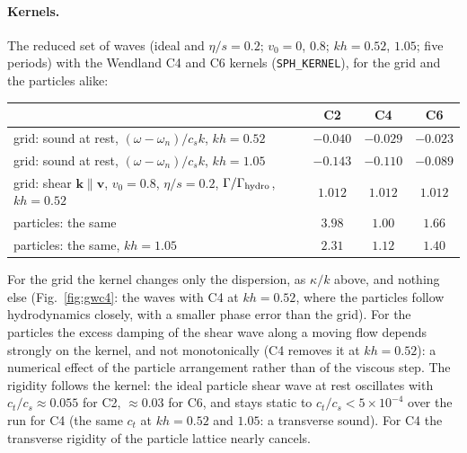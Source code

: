 \documentclass[11pt,aps,preprint,nofootinbib,superscriptaddress,tightenlines]{revtex4-2}
\def\Fig#1{Fig.~\ref{#1}}
\let\oldparagraph\paragraph
\renewcommand{\paragraph}{\par\bigskip\oldparagraph}
\begin{document}
\paragraph{Kernels.}  The reduced set of waves (ideal and $\eta/s=0.2$; $v_0=0$, $0.8$; $kh=0.52$, $1.05$; five periods)
with the Wendland C4 and C6 kernels (\texttt{SPH\_KERNEL}), for the grid and the particles alike:
\begin{center}
\begin{tabular}{lccc}
\hline
 & C2 & C4 & C6 \\ \hline
grid: sound at rest, $(\omega-\omega_n)/c_sk$, $kh=0.52$ & $-0.040$ & $-0.029$ & $-0.023$ \\
grid: sound at rest, $(\omega-\omega_n)/c_sk$, $kh=1.05$ & $-0.143$ & $-0.110$ & $-0.089$ \\
grid: shear $\bm k\parallel\bm v$, $v_0=0.8$, $\eta/s=0.2$, $\Gamma/\Gamma_{\rm hydro}$, $kh=0.52$ & $1.012$ & $1.012$ & $1.012$ \\
particles: the same & $3.98$ & $1.00$ & $1.66$ \\
particles: the same, $kh=1.05$ & $2.31$ & $1.12$ & $1.40$ \\
\hline
\end{tabular}
\end{center}
For the grid the kernel changes only the dispersion, as $\kappa/k$ above, and nothing else
(\Fig{fig:gwc4}: the waves with C4 at $kh=0.52$, where the particles follow hydrodynamics closely, with a
smaller phase error than the grid).  For the
particles the excess damping of the shear wave along a moving flow depends strongly on the kernel,
and not monotonically (C4 removes it at $kh=0.52$): a numerical effect of the particle arrangement
rather than of the viscous step.  The rigidity follows the kernel: the ideal particle shear wave at rest oscillates with
$c_t/c_s\approx0.055$ for C2, $\approx0.03$ for C6, and stays static to $c_t/c_s<5\times10^{-4}$ over the run for C4 (the
same $c_t$ at $kh=0.52$ and $1.05$: a transverse sound).  For C4 the transverse rigidity of the particle
lattice nearly cancels.
\end{document}
